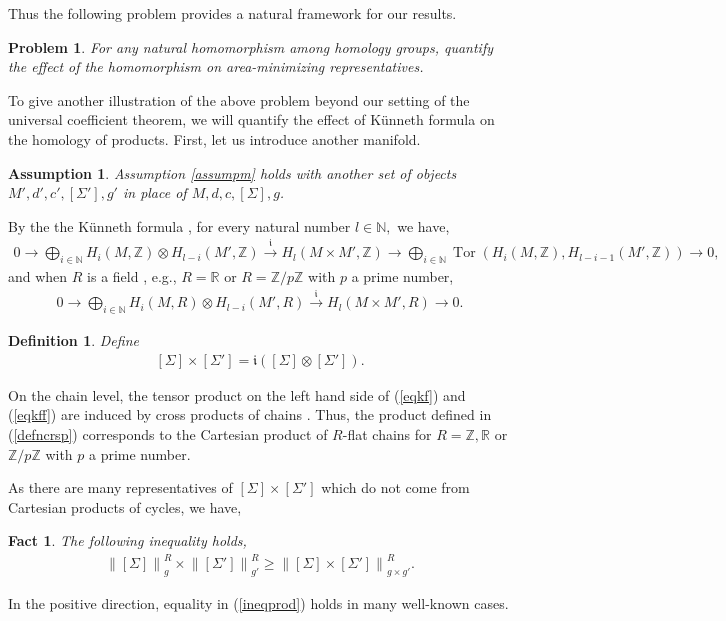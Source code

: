 \documentclass[11pt,a4paper]{amsart}
\numberwithin{equation}{section}
\newcommand{\Si}{\Sigma}
\newcommand{\no}[1]{\left\lVert#1\right\rVert}
\newcommand{\ts}{\otimes}
\newcommand{\N}{\mathbb{N}}
\newcommand{\R}{\mathbb{R}}
\newcommand{\Z}{\mathbb{Z}}
\theoremstyle{plain}
\newtheorem{assump}{Assumption}[subsection]
\newtheorem{fact}{Fact}[subsection]
\newtheorem{defn}{Definition}[subsection]
\newtheorem{prob}{Problem}
\theoremstyle{definition}
\numberwithin{equation}{subsection}
\begin{document}
	Thus the following problem provides a natural framework for our results.
	\begin{prob}
		For any natural homomorphism among homology groups, quantify the effect of the homomorphism on area-minimizing representatives.
	\end{prob}
	To give another illustration of the above problem beyond our setting of the universal coefficient theorem, we will quantify the effect of K\"{u}nneth formula on the homology of products. First, let us introduce another manifold.
	\begin{assump}\label{assumpmp}
		Assumption \ref{assumpm} holds with another set of objects $M',d',c',[\Si'],g'$ in place of $M,d,c,[\Si],g$.
	\end{assump}
	By the the K\"{u}nneth formula \cite[Theorem 3B.6]{AH}, for every natural number $l\in \N,$ we have,
	\begin{align}\label{eqkf}
		0\to \bigoplus_{i\in\N}H_i(M,\Z)\ts H_{l-i}(M',\Z)\overset{\mathfrak{i}}{\rightarrow} H_l(M\times M',\Z)\to\bigoplus_{i\in\N}\operatorname{Tor}\left(H_i(M,\Z),H_{l-i-1}(M',\Z)\right)\to0,
	\end{align}
	and when $R$ is a field \cite[Corollary 3B.7]{AH}, e.g., $R=\R$ or $R=\Z/p\Z$ with $p$ a prime number,
	\begin{align}\label{eqkff}
		0\to \bigoplus_{i\in\N}H_i(M,R)\ts H_{l-i}(M',R)\overset{\mathfrak{i}}{\rightarrow} H_l(M\times M',R)\to0.
	\end{align}
	\begin{defn}
		Define
		\begin{align}\label{defncrsp}
			[\Si]\times[\Si']=\mathfrak{i}\left([\Si]\ts [\Si']\right).
		\end{align}
	\end{defn}
	On the chain level, the tensor product on the left hand side of (\ref{eqkf}) and (\ref{eqkff}) are induced by cross products of chains \cite[Section 3.B]{AH}. Thus, the product defined in (\ref{defncrsp}) corresponds to the Cartesian product of $R$-flat chains for $R=\Z,\R$ or $\Z/p\Z$ with $p$ a prime number. 
	
	As there are many representatives of $[\Si]\times[\Si']$ which do not come from Cartesian products of cycles, we have, \begin{fact}
		The following inequality holds,
		\begin{align}\label{ineqprod}
			\no{[\Si]}^R_{g}\times \no{[\Si']}^R_{g'}\ge 
			\no{[\Si]\times [\Si']}^R_{g\times g'}.
		\end{align}
	\end{fact}
	In the positive direction, equality in (\ref{ineqprod}) holds in many well-known cases. 
	
\end{document}
